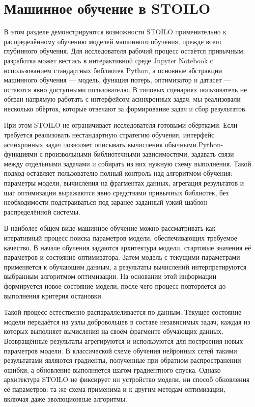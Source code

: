 \documentclass[a4paper,12pt]{extarticle}
\begin{document}
\section{Машинное обучение в STOILO}
\label{sec:stoiloddl}

В этом разделе демонстрируются возможности STOILO применительно к распределённому обучению моделей машинного обучения, прежде всего глубинного обучения.
Для исследователя рабочий процесс остаётся привычным: разработка может вестись в интерактивной среде Jupyter Notebook с использованием стандартных библиотек Python, а основные абстракции машинного обучения — модель, функция потерь, оптимизатор и датасет — остаются явно доступными пользователю.
В типовых сценариях пользователь не обязан напрямую работать с интерфейсом асинхронных задач: мы реализовали несколько обёрток, которые отвечают за формирование задач и сбор результатов.

При этом STOILO не ограничивает исследователя готовыми обёртками.
Если требуется реализовать нестандартную стратегию обучения, интерфейс асинхронных задач позволяет описывать вычисления обычными Python-функциями с произвольными библиотечными зависимостями, задавать связи между отдельными задачами и собирать из них нужную схему выполнения.
Такой подход оставляет пользователю полный контроль над алгоритмом обучения: параметры модели, вычисления на фрагментах данных, агрегация результатов и шаг оптимизации выражаются явно средствами привычных библиотек, без необходимости подстраиваться под заранее заданный узкий шаблон распределённой системы.

В наиболее общем виде машинное обучение можно рассматривать как итеративный процесс поиска параметров модели, обеспечивающих требуемое качество.
В начале обучения задаются архитектура модели, стартовые значения её параметров и состояние оптимизатора.
Затем модель с текущими параметрами применяется к обучающим данным, а результаты вычислений интерпретируются выбранным алгоритмом оптимизации.
На основании этой информации формируется новое состояние модели, после чего процесс повторяется до выполнения критерия остановки.

Такой процесс естественно распараллеливается по данным.
Текущее состояние модели передаётся на узлы добровольцев в составе независимых задач, каждая из которых выполняет вычисления на своём фрагменте обучающих данных.
Возвращённые результаты агрегируются и используются для построения новых параметров модели.
В классической схеме обучения нейронных сетей такими результатами являются градиенты, полученные при обратном распространении ошибки, а обновление выполняется шагом градиентного спуска.
Однако архитектура STOILO не фиксирует ни устройство модели, ни способ обновления её параметров: та же схема применима и к другим методам оптимизации, включая даже эволюционные алгоритмы.
\end{document}
